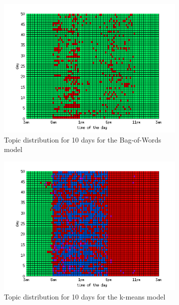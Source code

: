 \documentclass[11pt,a4paper]{article}
\begin{document}
\begin{figure}[h!]
 \centering
 \begin{subfigure}[b]{0.45\linewidth}
  \centering
  \includegraphics[width=\textwidth]{Pictures/DayTopicsTs96k5bow.png}
  \caption{Topic distribution for 10 days for the Bag-of-Words model}
 \end{subfigure}
 \begin{subfigure}[b]{0.45\linewidth}
  \centering
  \includegraphics[width=\textwidth]{Pictures/DayTopicsTs96k5Clus.png}
  \caption{Topic distribution for 10 days for the k-means model}
 \end{subfigure}
 \caption{}
 \label{fig:bow/kMeans}
\end{figure}
\end{document}
